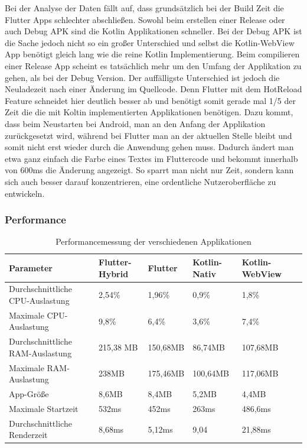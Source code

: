 Bei der Analyse der Daten fällt auf, dass grundsätzlich bei der Build Zeit die Flutter Apps schlechter abschließen. Sowohl beim erstellen einer Release oder auch Debug APK sind die Kotlin Applikationen schneller. Bei der Debug APK ist die Sache jedoch nicht so ein großer Unterschied und selbst die Kotlin-WebView App benötigt gleich lang wie die reine Kotlin Implementierung. Beim compilieren einer Release App scheint es tatsächlich mehr um den Umfang der Applikation zu gehen, als bei der Debug Version.
Der auffälligste Unterschied ist jedoch die Neuladezeit nach einer Änderung im Quellcode. Denn Flutter mit dem HotReload Feature schneidet hier deutlich besser ab und benötigt somit gerade mal 1/5 der Zeit die die mit Koltin implementierten Applikationen benötigen. Dazu kommt, dass beim Neustarten bei Android, man an den Anfang der Applikation zurückgesetzt wird, während bei Flutter man an der aktuellen Stelle bleibt und somit nicht erst wieder durch die Anwendung gehen muss. Dadurch ändert man etwa ganz einfach die Farbe eines Textes im Fluttercode und bekommt innerhalb von 600ms die Änderung angezeigt. So sparrt man nicht nur Zeit, sondern kann sich auch besser darauf konzentrieren, eine ordentliche Nutzeroberfläche zu entwickeln.

\subsubsection{Performance}


\begin{table}
\centering
\caption{Performancemessung der verschiedenen Applikationen }
\begin{tabular}{ |p{4cm}||p{3cm}|p{2cm}|p{2cm}|p{2cm}|p{2cm}| }
 \hline
 Parameter & Flutter-Hybrid & Flutter & Kotlin-Nativ & Kotlin-WebView \\
 \hline
 Durchschnittliche CPU-Auslastung       &   2,54\%&   1,96\%& 0,9\%& 1,8\%\\
  \hline
 Maximale CPU- Auslastung  & 9,8\%& 6,4\%& 3,6\%& 7,4\%\\
  \hline
 Durchschnittliche RAM-Auslastung & 215,38 MB& 150,68MB& 86,74MB& 107,68MB\\
  \hline
 Maximale RAM- Auslastung & 238MB& 175,46MB& 100,64MB& 117,06MB\\
  \hline
 App-Größe & 8,6MB& 8,4MB& 5,2MB& 4,4MB\\
  \hline
 Maximale Startzeit & 532ms& 452ms& 263ms& 486,6ms\\
 \hline
 Durchschnittliche Renderzeit &8,68ms& 5,12ms& 9,04& 21,88ms\\
 \hline
\end{tabular}
\label{tab:evaluations_performance}
\end{table}

